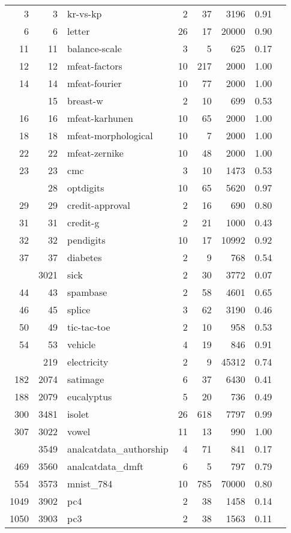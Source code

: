 \documentclass[twoside,11pt]{article}
\begin{document}
\begin{table}[h]
\begin{adjustbox}{center, width=7.75cm, totalheight=12cm}
\begin{tabular}{rrlrrrrr}
\midrule
3 & 3 & kr-vs-kp & 2 & 37 & 3196 & 0.91\\
6 & 6 & letter & 26 & 17 & 20000 & 0.90\\
11 & 11 & balance-scale & 3 & 5 & 625 & 0.17\\
12 & 12 & mfeat-factors & 10 & 217 & 2000 & 1.00\\
14 & 14 & mfeat-fourier & 10 & 77 & 2000 & 1.00\\
\addlinespace
15 & 15 & breast-w & 2 & 10 & 699 & 0.53\\
16 & 16 & mfeat-karhunen & 10 & 65 & 2000 & 1.00\\
18 & 18 & mfeat-morphological & 10 & 7 & 2000 & 1.00\\
22 & 22 & mfeat-zernike & 10 & 48 & 2000 & 1.00\\
23 & 23 & cmc & 3 & 10 & 1473 & 0.53\\
\addlinespace
28 & 28 & optdigits & 10 & 65 & 5620 & 0.97\\
29 & 29 & credit-approval & 2 & 16 & 690 & 0.80\\
31 & 31 & credit-g & 2 & 21 & 1000 & 0.43\\
32 & 32 & pendigits & 10 & 17 & 10992 & 0.92\\
37 & 37 & diabetes & 2 & 9 & 768 & 0.54\\
\addlinespace
38 & 3021 & sick & 2 & 30 & 3772 & 0.07\\
44 & 43 & spambase & 2 & 58 & 4601 & 0.65\\
46 & 45 & splice & 3 & 62 & 3190 & 0.46\\
50 & 49 & tic-tac-toe & 2 & 10 & 958 & 0.53\\
54 & 53 & vehicle & 4 & 19 & 846 & 0.91\\
\addlinespace
151 & 219 & electricity & 2 & 9 & 45312 & 0.74\\
182 & 2074 & satimage & 6 & 37 & 6430 & 0.41\\
188 & 2079 & eucalyptus & 5 & 20 & 736 & 0.49\\
300 & 3481 & isolet & 26 & 618 & 7797 & 0.99\\
307 & 3022 & vowel & 11 & 13 & 990 & 1.00\\
\addlinespace
458 & 3549 & analcatdata\_authorship & 4 & 71 & 841 & 0.17\\
469 & 3560 & analcatdata\_dmft & 6 & 5 & 797 & 0.79\\
554 & 3573 & mnist\_784 & 10 & 785 & 70000 & 0.80\\
1049 & 3902 & pc4 & 2 & 38 & 1458 & 0.14\\
1050 & 3903 & pc3 & 2 & 38 & 1563 & 0.11\\

\end{tabular}
\end{adjustbox}
\end{table}
\end{document}
